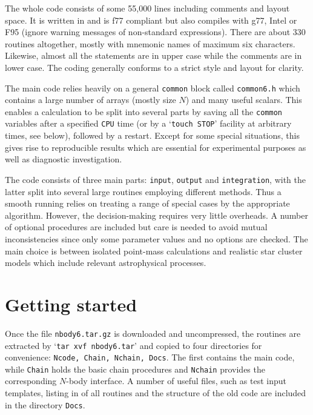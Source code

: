 \documentclass[12pt]{article}
\begin{document}
The whole code consists of some 55,000 lines including comments and layout
space.
It is written in {} and is f77 compliant but also compiles
with g77, Intel or F95 (ignore warning messages of non-standard expressions).
There are about 330 routines altogether, mostly with mnemonic names of
maximum six characters.
Likewise, almost all the {} statements are in upper case while
the comments are in lower case.
The coding generally conforms to a strict style and layout for clarity.

The main code relies heavily on a general {\tt common} block called
{\tt common6.h} which contains a large number of arrays (mostly size $N$) and
many useful scalars.
This enables a calculation to be split into several parts by saving all the
{\tt common} variables after a specified {\tt CPU} time (or by a
`{\tt touch STOP}' facility at arbitrary times, see below), followed by a
restart.
Except for some special situations, this gives rise to reproducible results
which are essential for experimental purposes as well as diagnostic
investigation.

The code consists of three main parts: {\tt input}, {\tt output} and
{\tt integration}, with the latter split into several large routines
employing different methods.
Thus a smooth running relies on treating a range of special cases by the
appropriate algorithm.
However, the decision-making requires very little overheads.
A number of optional procedures are included but care is needed to avoid
mutual inconsistencies since only some parameter values and no options are
checked.
The main choice is between isolated point-mass calculations and
realistic star cluster models which include relevant astrophysical processes.

\section{Getting started}

Once the file {\tt nbody6.tar.gz} is downloaded and uncompressed, the routines
are extracted by `{\tt tar xvf nbody6.tar}' and copied to four directories
for convenience: {\tt Ncode, Chain, Nchain, Docs}.
The first contains the main code, while {\tt Chain} holds the basic chain
procedures and {\tt Nchain} provides the corresponding $N$-body interface.
A number of useful files, such as test input templates, listing in {}
of all routines and the structure of the old code {} are included
in the directory {\tt Docs}.
\end{document}
